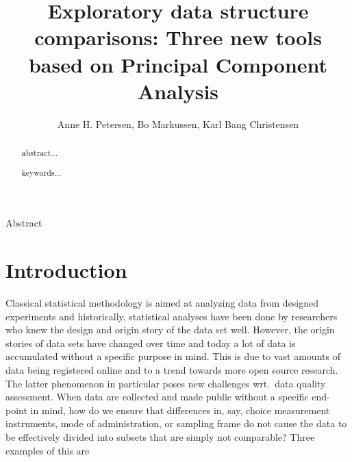 \documentclass[titlepage,11pt,twoside]{article}
\begin{document}

\title{Exploratory data structure comparisons: Three new tools based on Principal Component Analysis}

\author{Anne H. Petersen, Bo Markussen, Karl Bang Christensen}



\vspace{\fill}






\begin{center}\vskip3pt


\vspace{32pt}

Abstract\vskip3pt

\end{center}


\begin{abstract}
abstract...
\begin{keywords}
keywords...
\end{keywords}
\end{abstract}

\vspace{\fill}\newpage

\section{Introduction}
\label{sec:introduction}

Classical statistical methodology is aimed at analyzing data from designed experiments and historically, statistical analyses have been done by researchers who knew the design and origin story of the data set well. However, the origin stories of data sets have changed over time and today a lot of data is accumulated without a specific purpose in mind. This is due to vast amounts of data being registered online and to a trend towards more open source research. The latter phenomenon in particular poses new challenges wrt.\ data quality assessment. When data are collected and made public without a specific end-point in mind, how do we ensure that differences in, say, choice measurement instruments, mode of administration, or sampling frame do not cause the data to be effectively divided into subsets that are simply not comparable? Three examples of this are
\end{document}

